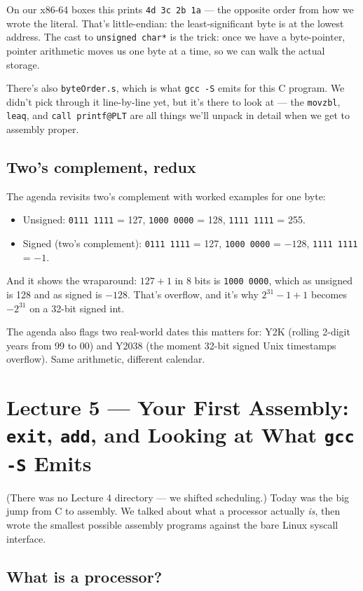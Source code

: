 \documentclass[11pt]{article}
\begin{document}
On our x86-64 boxes this prints \texttt{4d 3c 2b 1a} --- the
opposite order from how we wrote the literal. That's
little-endian: the least-significant byte is at the lowest address.
The cast to \texttt{unsigned char*} is the trick: once we have a
byte-pointer, pointer arithmetic moves us one byte at a time, so
we can walk the actual storage.

There's also \texttt{byteOrder.s}, which is what \texttt{gcc -S}
emits for this C program. We didn't pick through it line-by-line
yet, but it's there to look at --- the \texttt{movzbl},
\texttt{leaq}, and \texttt{call printf@PLT} are all things we'll
unpack in detail when we get to assembly proper.

\subsection*{Two's complement, redux}

The agenda revisits two's complement with worked examples for one
byte:
\begin{itemize}
  \item Unsigned: \texttt{0111 1111} = 127, \texttt{1000 0000} = 128,
    \texttt{1111 1111} = 255.
  \item Signed (two's complement): \texttt{0111 1111} = 127,
    \texttt{1000 0000} = $-128$, \texttt{1111 1111} = $-1$.
\end{itemize}
And it shows the wraparound: $127+1$ in 8 bits is \texttt{1000 0000},
which as unsigned is 128 and as signed is $-128$. That's overflow,
and it's why $2^{31}-1+1$ becomes $-2^{31}$ on a 32-bit signed int.

The agenda also flags two real-world dates this matters for: Y2K
(rolling 2-digit years from 99 to 00) and Y2038 (the moment 32-bit
signed Unix timestamps overflow). Same arithmetic, different
calendar.

\section{Lecture 5 --- Your First Assembly: \texttt{exit}, \texttt{add}, and Looking at What \texttt{gcc -S} Emits}

(There was no Lecture 4 directory --- we shifted scheduling.)
Today was the big jump from C to assembly. We talked about what a
processor actually \emph{is}, then wrote the smallest possible
assembly programs against the bare Linux syscall interface.

\subsection*{What is a processor?}
\end{document}

